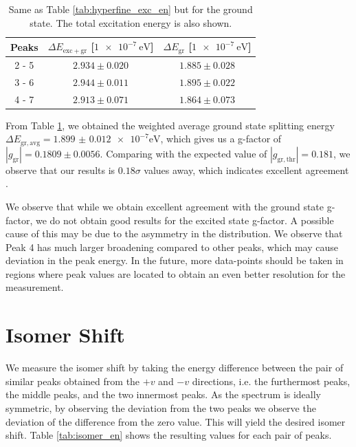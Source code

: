 \documentclass[a4paper]{report}
\numberwithin{equation}{section}
\begin{document}
\begin{table}[!ht]
    \centering
    \begin{tabular}{|c|c|c|}
    \hline
        Peaks & $\Delta E_\mathrm{exc + gr}$ [$\SI{1e-7}{\electronvolt}$] & $\Delta E_\mathrm{gr}$ [$\SI{1e-7}{\electronvolt}$]\\ \hline
        2 - 5 & $2.934 \pm 0.020$ & $1.885 \pm 0.028$\\ \hline
        3 - 6 & $2.944 \pm 0.011$ & $1.895 \pm 0.022$\\ \hline
        4 - 7 & $2.913 \pm 0.071$ & $1.864 \pm 0.073$\\ \hline
    \end{tabular}
    \caption{Same as Table \ref{tab:hyperfine_exc_en} but for the ground state. The total excitation energy is also shown.}
    \label{tab:hyperfine_gr_en}
\end{table}

From Table \ref{tab:hyperfine_gr_en}, we obtained the weighted average ground state splitting energy $\Delta E_{\mathrm{gr, avg}} = \num[scientific-notation=true]{1.899(12)e-7}\si{\electronvolt}$, 
which gives us a g-factor of $| g_\mathrm{gr} | = 0.1809 \pm 0.0056$. Comparing with the expected value of $| g_\mathrm{gr, thr} | = 0.181$, 
we observe that our results is $0.18\sigma$ values away, which indicates excellent agreement \cite{VANIN2007}.\par 

We observe that while we obtain excellent agreement with the ground state g-factor, we do not obtain good results for the excited 
state g-factor. A possible cause of this may be due to the asymmetry in the distribution. We observe that Peak 4 has much larger 
broadening compared to other peaks, which may cause deviation in the peak energy. In the future, more data-points should be taken in 
regions where peak values are located to obtain an even better resolution for the measurement.

\section{Isomer Shift}

We measure the isomer shift by taking the energy difference between the pair of similar peaks obtained from the $+v$ and $-v$
directions, i.e. the furthermost peaks, the middle peaks, and the two innermost peaks. As the spectrum is ideally symmetric, 
by observing the deviation from the two peaks we observe the deviation of the difference from the zero value. This will yield the 
desired isomer shift. Table \ref{tab:isomer_en} shows the resulting values for each pair of peaks. 
\end{document}
